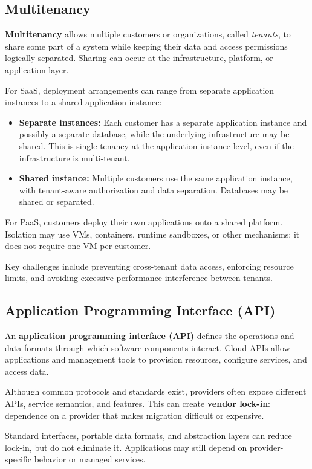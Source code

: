 \subsection{Multitenancy}
\textbf{Multitenancy} allows multiple customers or organizations, called \emph{tenants}, to share some part of a system while keeping their data and access permissions logically separated. Sharing can occur at the infrastructure, platform, or application layer.

For SaaS, deployment arrangements can range from separate application instances to a shared application instance:

\begin{itemize}
  \item \textbf{Separate instances:} Each customer has a separate application instance and possibly a separate database, while the underlying infrastructure may be shared. This is single-tenancy at the application-instance level, even if the infrastructure is multi-tenant.
  \item \textbf{Shared instance:} Multiple customers use the same application instance, with tenant-aware authorization and data separation. Databases may be shared or separated.
\end{itemize}

For PaaS, customers deploy their own applications onto a shared platform. Isolation may use VMs, containers, runtime sandboxes, or other mechanisms; it does not require one VM per customer.

Key challenges include preventing cross-tenant data access, enforcing resource limits, and avoiding excessive performance interference between tenants.

\subsection{Application Programming Interface (API)}
An \textbf{application programming interface (API)} defines the operations and data formats through which software components interact. Cloud APIs allow applications and management tools to provision resources, configure services, and access data.

Although common protocols and standards exist, providers often expose different APIs, service semantics, and features. This can create \textbf{vendor lock-in}: dependence on a provider that makes migration difficult or expensive.

Standard interfaces, portable data formats, and abstraction layers can reduce lock-in, but do not eliminate it. Applications may still depend on provider-specific behavior or managed services.

